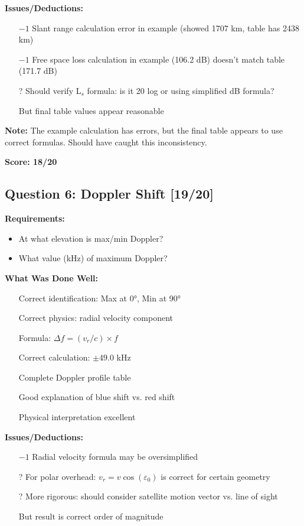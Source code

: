 \documentclass[11pt,letterpaper]{article}
\begin{document}
\textbf{Issues/Deductions:}
\begin{itemize}
    \item[\color{red}$-1$] Slant range calculation error in example (showed 1707 km, table has 2438 km)
    \item[\color{red}$-1$] Free space loss calculation in example (106.2 dB) doesn't match table (171.7 dB)
    \item[\color{orange}?] Should verify L$_s$ formula: is it 20 log or using simplified dB formula?
    \item[\color{green}\checkmark] But final table values appear reasonable
\end{itemize}

\textbf{Note:} The example calculation has errors, but the final table appears to use correct formulas. Should have caught this inconsistency.

\textbf{Score: 18/20}

\subsection{Question 6: Doppler Shift [19/20]}

\textbf{Requirements:}
\begin{itemize}
    \item At what elevation is max/min Doppler?
    \item What value (kHz) of maximum Doppler?
\end{itemize}

\textbf{What Was Done Well:}
\begin{itemize}
    \item[\color{green}\checkmark] Correct identification: Max at 0°, Min at 90°
    \item[\color{green}\checkmark] Correct physics: radial velocity component
    \item[\color{green}\checkmark] Formula: $\Delta f = (v_r/c) \times f$
    \item[\color{green}\checkmark] Correct calculation: $\pm 49.0$ kHz
    \item[\color{green}\checkmark] Complete Doppler profile table
    \item[\color{green}\checkmark] Good explanation of blue shift vs. red shift
    \item[\color{green}\checkmark] Physical interpretation excellent
\end{itemize}

\textbf{Issues/Deductions:}
\begin{itemize}
    \item[\color{red}$-1$] Radial velocity formula may be oversimplified
    \item[\color{orange}?] For polar overhead: $v_r = v \cos(\varepsilon_0)$ is correct for certain geometry
    \item[\color{orange}?] More rigorous: should consider satellite motion vector vs. line of sight
    \item[\color{green}\checkmark] But result is correct order of magnitude
\end{itemize}
\end{document}
